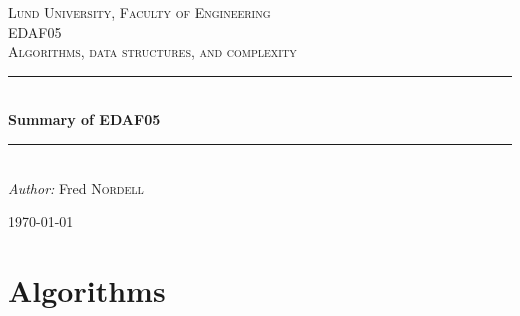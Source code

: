 \documentclass[12pt]{article} %
\begin{document}

\begin{titlepage}

\newcommand{\HRule}{\rule{\linewidth}{0.5mm}} %

\center %

\textsc{\LARGE Lund University, Faculty of Engineering}\\[1.5cm] %
\textsc{\Large EDAF05}\\[0.5cm] %
\textsc{\large Algorithms, data structures, and complexity}\\[0.5cm] %

\HRule \\[1cm]
{ \huge \bfseries Summary of EDAF05}\\[0.4cm] %
\HRule \\[1.5cm]

\emph{Author:} Fred \textsc{Nordell} %

{\large \today}\\[3cm] %


\vfill %

\end{titlepage}


\tableofcontents %
\lstlistoflistings %
\listoffigures %

\newpage %


\section{Algorithms} %
\end{document}
